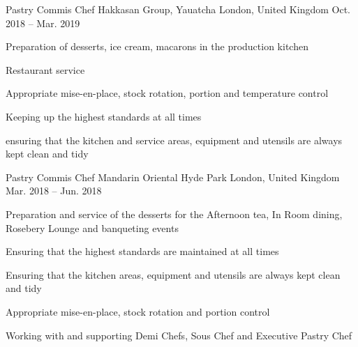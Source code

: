 

\begin{cventries}

  \cventry
    {Pastry Commis Chef} %
    {Hakkasan Group, Yauatcha} %
    {London, United Kingdom} %
    {Oct. 2018 -- Mar. 2019} %
    {
      \begin{cvitems} %
        \item {Preparation of desserts, ice cream, macarons in the production kitchen}
        \item {Restaurant service}
        \item {Appropriate mise-en-place, stock rotation, portion and temperature control}
        \vfill\null
        \columnbreak
        \item {Keeping up the highest standards at all times}
        \item {ensuring that the kitchen and service areas, equipment and utensils are always kept clean and tidy}
      \end{cvitems}
    }

  \cventry
    {Pastry Commis Chef} %
    {Mandarin Oriental Hyde Park} %
    {London, United Kingdom} %
    {Mar. 2018 -- Jun. 2018} %
    {
      \begin{cvitems} %
        \item {Preparation and service of the desserts for the Afternoon tea, In Room dining, Rosebery Lounge and banqueting events}
        \item {Ensuring that the highest standards are maintained at all times}
        \item {Ensuring that the kitchen areas, equipment and utensils are always kept clean and tidy}
        \vfill\null
        \columnbreak
        \item {Appropriate mise-en-place, stock rotation and portion control}
        \item {Working with and supporting Demi Chefs, Sous Chef and Executive Pastry Chef}
      \end{cvitems}
    }


\end{cventries}
